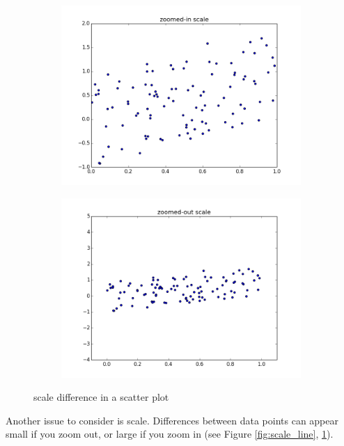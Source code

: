 \begin{figure}[h]
\centering
\begin{subfigure}{.4\textwidth}
\centering
\includegraphics[width=\textwidth]{scale_scatter_zoomed_in.png}
\end{subfigure}
\begin{subfigure}{.4\textwidth}
\centering
\includegraphics[width=\textwidth]{scale_scatter_zoomed_out.png}
\end{subfigure}
\caption{scale difference in a scatter plot}
\label{fig:scale_scatter}
\end{figure}



Another issue to consider is scale. Differences between data points can appear small if you zoom out, or large if you zoom in (see Figure \ref{fig:scale_line}, \ref{fig:scale_scatter}). 


